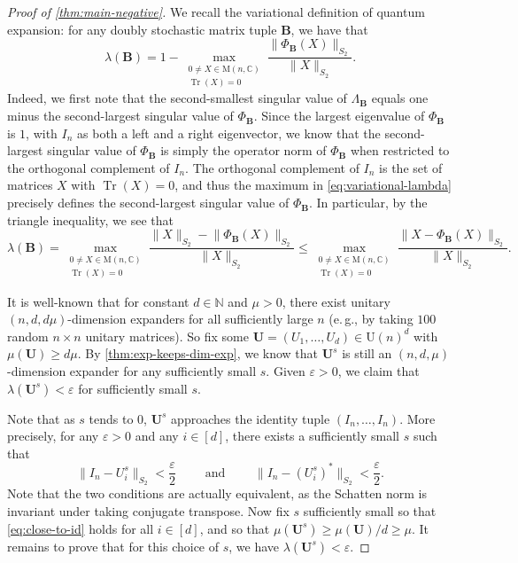 \documentclass[11pt]{article}
\newcommand{\N}{{\mathbb N}}
\newcommand{\eg}{e.\,g.}
\theoremstyle{plain}
\numberwithin{equation}{section}
\theoremstyle{definition}
\newcommand{\bC}{\mathbb{C}}
\DeclareMathOperator{\trace}{Tr}
\newcommand{\norm}[1]{\lVert#1\rVert}
\newcommand{\M}{\mathrm{M}}
\newcommand{\tuple}[1]{\mathbf{#1}}
\newcommand{\vB}{\tuple{B}}
\newcommand{\vU}{\tuple{U}}
\begin{document}
\begin{proof}[Proof of \cref{thm:main-negative}]

    We recall the variational definition of quantum expansion: for any doubly stochastic matrix tuple $\vB$, we have that
    \begin{equation}\label{eq:variational-lambda}
        \lambda(\vB) = 1- \max_{\substack{0 \neq X \in \M(n,\bC)\\\trace(X)=0}} \frac{\norm{\Phi_{\vB}(X)}_{S_2}}{\norm X_{S_2}}.
    \end{equation}
    Indeed, we first note that the second-smallest singular value of $\Lambda_{\vB}$ equals one minus the second-largest singular value of $\Phi_{\vB}$. Since the largest eigenvalue of $\Phi_{\vB}$ is $1$, with $I_n$ as both a left and a right eigenvector, we know that the second-largest singular value of $\Phi_{\vB}$ is simply the operator norm of $\Phi_{\vB}$ when restricted to the orthogonal complement of $I_n$. The orthogonal complement of $I_n$ is the set of matrices $X$ with $\trace(X)=0$, and thus the maximum in \eqref{eq:variational-lambda} precisely defines the second-largest singular value of $\Phi_{\vB}$. In particular, by the triangle inequality, we see that
    \begin{equation}
        \lambda(\vB) = \max_{\substack{0 \neq X \in \M(n,\bC)\\\trace(X)=0}} \frac{\norm X_{S_2} - \norm{\Phi_\vB(X)}_{S_2}}{\norm X_{S_2}} \leq \max_{\substack{0 \neq X \in \M(n,\bC)\\\trace(X)=0}} \frac{\norm{X-\Phi_\vB(X)}_{S_2}}{\norm X_{S_2}}. \label{eq:lambda-ub}
    \end{equation}

  It is well-known that for constant $d \in \N$ and $\mu>0$, there exist unitary $(n,d,d\mu)$-dimension expanders for all sufficiently large $n$ (\eg, by taking $100$ random $n \times n$ unitary matrices). So fix some $\vU=(U_1,\dots,U_d)\in \mathrm{U}(n)^d$ with $\mu(\vU) \geq d\mu$. By \cref{thm:exp-keeps-dim-exp}, we know that $\vU^s$ is still an $(n,d,\mu)$-dimension expander for any sufficiently small $s$. Given $\varepsilon>0$, we claim that $\lambda(\vU^s)< \varepsilon$ for sufficiently small $s$.

    Note that as $s$ tends to $0$, $\vU^s$ approaches the identity tuple $(I_n,\dots,I_n)$. More precisely, for any $\varepsilon>0$ and any $i\in[d]$, there exists a sufficiently small $s$ such that 
    \begin{equation}\label{eq:close-to-id}
         \norm{I_n - U_i^s}_{S_2}<\frac \varepsilon 2 \qquad \text{ and } \qquad \norm{I_n - (U_i^s)^*}_{S_2} < \frac \varepsilon 2.
    \end{equation}
    Note that the two conditions are actually equivalent, as the Schatten norm is invariant under taking conjugate transpose.
    Now fix $s$ sufficiently small so that \eqref{eq:close-to-id} holds for all $i \in [d]$, and so that $\mu(\vU^s) \geq \mu(\vU)/d \geq \mu$. It remains to prove that for this choice of $s$, we have $\lambda(\vU^s)<\varepsilon$. 


\end{proof}
\end{document}
